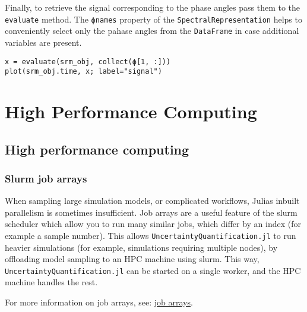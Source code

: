 Finally, to retrieve the signal corresponding to the phase angles  pass them to the \texttt{evaluate} method. The \texttt{ϕnames} property of the \texttt{SpectralRepresentation} helps to conveniently select only the pahase angles from the \texttt{DataFrame} in case additional variables are present.




\begin{verbatim}
x = evaluate(srm_obj, collect(ϕ[1, :]))
plot(srm_obj.time, x; label="signal")
\end{verbatim}



\begin{figure}
\centering
{}
\caption{}
\end{figure}




\chapter{High Performance Computing}


\section{High performance computing}



\label{15324308029856110982}{}


\subsection{Slurm job arrays}



\label{3608381597528543034}{}


When sampling large simulation models, or complicated workflows, Julia{\textquotesingle}s inbuilt parallelism is sometimes insufficient. Job arrays are a useful feature of the slurm scheduler which allow you to run many similar jobs, which differ by an index (for example a sample number). This allows \texttt{UncertaintyQuantification.jl} to run heavier simulations (for example, simulations requiring multiple nodes), by offloading model sampling to an HPC machine using slurm. This way, \texttt{UncertaintyQuantification.jl} can be started on a single worker, and the HPC machine handles the rest.



For more information on job arrays, see: \href{https://slurm.schedmd.com/job\_array.html}{job arrays}.



